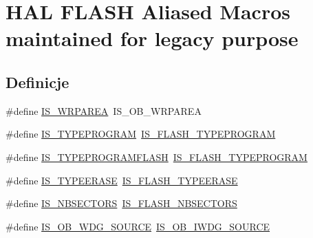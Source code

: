\hypertarget{group___h_a_l___f_l_a_s_h___aliased___macros}{}\section{H\+AL F\+L\+A\+SH Aliased Macros maintained for legacy purpose}
\label{group___h_a_l___f_l_a_s_h___aliased___macros}
\subsection*{Definicje}
\begin{DoxyCompactItemize}
\item 
\#define \hyperlink{group___h_a_l___f_l_a_s_h___aliased___macros_gadd88d78ad45a7fd58291e9fdc10e3a96}{I\+S\+\_\+\+W\+R\+P\+A\+R\+EA}~I\+S\+\_\+\+O\+B\+\_\+\+W\+R\+P\+A\+R\+EA
\item 
\#define \hyperlink{group___h_a_l___f_l_a_s_h___aliased___macros_gacce7e0976f49d61c90318c4652dee488}{I\+S\+\_\+\+T\+Y\+P\+E\+P\+R\+O\+G\+R\+AM}~\hyperlink{group___f_l_a_s_h___i_s___f_l_a_s_h___definitions_gaa189973d36fcbbaf7f758c682247ad39}{I\+S\+\_\+\+F\+L\+A\+S\+H\+\_\+\+T\+Y\+P\+E\+P\+R\+O\+G\+R\+AM}
\item 
\#define \hyperlink{group___h_a_l___f_l_a_s_h___aliased___macros_ga74a253c5a4e8847ae19fdb4584298543}{I\+S\+\_\+\+T\+Y\+P\+E\+P\+R\+O\+G\+R\+A\+M\+F\+L\+A\+SH}~\hyperlink{group___f_l_a_s_h___i_s___f_l_a_s_h___definitions_gaa189973d36fcbbaf7f758c682247ad39}{I\+S\+\_\+\+F\+L\+A\+S\+H\+\_\+\+T\+Y\+P\+E\+P\+R\+O\+G\+R\+AM}
\item 
\#define \hyperlink{group___h_a_l___f_l_a_s_h___aliased___macros_gaed75727038bff22d573cfbf1ed874fbf}{I\+S\+\_\+\+T\+Y\+P\+E\+E\+R\+A\+SE}~\hyperlink{group___f_l_a_s_h_ex___i_s___f_l_a_s_h___definitions_gaf15a6822d2421a33b6857059348ab476}{I\+S\+\_\+\+F\+L\+A\+S\+H\+\_\+\+T\+Y\+P\+E\+E\+R\+A\+SE}
\item 
\#define \hyperlink{group___h_a_l___f_l_a_s_h___aliased___macros_gae0a228ff6185c6f7532fa798bdba222e}{I\+S\+\_\+\+N\+B\+S\+E\+C\+T\+O\+RS}~\hyperlink{group___f_l_a_s_h_ex___i_s___f_l_a_s_h___definitions_ga5b85e63e0066bf7ca518cb3790ad67e0}{I\+S\+\_\+\+F\+L\+A\+S\+H\+\_\+\+N\+B\+S\+E\+C\+T\+O\+RS}
\item 
\#define \hyperlink{group___h_a_l___f_l_a_s_h___aliased___macros_ga8270f77e735a199dfce1dd935cd4a2c8}{I\+S\+\_\+\+O\+B\+\_\+\+W\+D\+G\+\_\+\+S\+O\+U\+R\+CE}~\hyperlink{group___f_l_a_s_h_ex___i_s___f_l_a_s_h___definitions_gaf2871652c08e76499d9449be6556f12c}{I\+S\+\_\+\+O\+B\+\_\+\+I\+W\+D\+G\+\_\+\+S\+O\+U\+R\+CE}
\end{DoxyCompactItemize}


